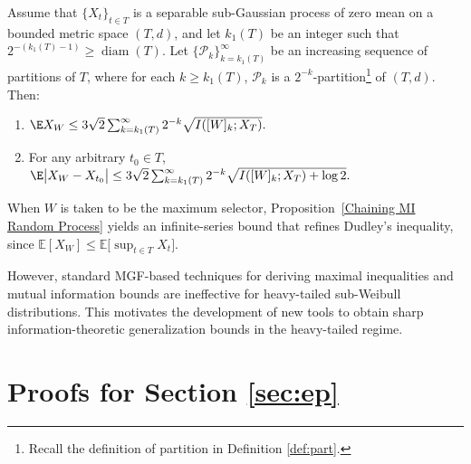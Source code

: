 \documentclass[11pt]{article}
\begin{document}
\begin{proposition}\label{Chaining MI Random Process}
Assume that $\{X_t\}_{t\in T}$ is a separable sub-Gaussian process of zero mean on a bounded metric space $(T,d)$, and let $k_1(T)$ be an integer such that $2^{-\left(k_1(T)-1\right)} \geq \operatorname{diam}(T)$. Let $\{\mathcal{P}_k\}_{k=k_1(T)}^{\infty}$ be an increasing sequence of partitions of $T$, where for each $k\geq k_1(T)$, $\mathcal{P}_k$ is a $2^{-k}$-partition\footnote{Recall the definition of partition in Definition \ref{def:part}.} of $(T,d)$. Then:
\begin{enumerate}
\item
$\E X_W \leq 3\sqrt{2}\sum_{k=k_1(T)}^{\infty}2^{-k}\sqrt{I([W]_k;X_T)}.$
\item For any arbitrary $t_0\in T$,
$
\E\bigl\lvert X_W-X_{t_0}\bigr\rvert \leq 3\sqrt{2}\sum_{k=k_1(T)}^{\infty}2^{-k}\sqrt{I([W]_k;X_T)+\log 2}.
$
\end{enumerate}
\end{proposition}

When $W$ is taken to be the maximum selector, Proposition~\ref{Chaining MI Random Process} yields an infinite-series bound that refines Dudley's inequality, since $\mathbb{E}[X_W] \leq \mathbb{E}\bigl[\sup _{t \in T} X_t\bigr]$.

However, standard MGF-based techniques for deriving maximal inequalities and mutual information bounds are ineffective for heavy-tailed sub-Weibull distributions. This motivates the development of new tools to obtain sharp information-theoretic generalization bounds in the heavy-tailed regime. 



\section{Proofs for Section \ref{sec:ep}}\label{se: proof2}
\end{document}
